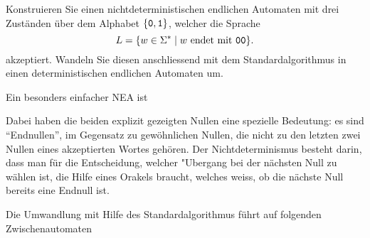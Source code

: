 Konstruieren Sie einen nichtdeterministischen endlichen Automaten
mit drei Zuständen
über dem Alphabet $\{{\tt 0},{\tt 1}\}$, welcher die Sprache
\[
L=\{w\in\Sigma^*\;|\; \text{$w$ endet mit {\tt 00}}\}.
\]
akzeptiert.
Wandeln Sie diesen anschliessend mit dem Standardalgorithmus
in einen deterministischen endlichen Automaten um.


\begin{loesung}
\def\zustand#1#2{
	\draw #1 circle[radius=0.4];
	\node at #1 {#2};
}
\def\akzeptierzustand#1#2{
	\draw #1 circle[radius=0.34];
	\zustand{#1}{#2}
}
\def\pfeil#1#2{
	\draw[->,shorten >= 0.4cm,shorten <= 0.4cm] #1 -- #2;
}
Ein besonders einfacher NEA ist
\begin{center}
\end{center}
Dabei haben die beiden explizit gezeigten Nullen eine spezielle
Bedeutung: es sind ``Endnullen'', im Gegensatz zu gewöhnlichen
Nullen, die nicht zu den letzten zwei Nullen eines akzeptierten Wortes
gehören.
Der Nichtdeterminismus besteht darin, dass man für die
Entscheidung, welcher "Ubergang bei der nächsten Null zu wählen
ist, die Hilfe eines Orakels braucht, welches weiss, ob die
nächste Null bereits eine Endnull ist.

Die Umwandlung mit Hilfe des Standardalgorithmus führt auf folgenden
Zwischenautomaten
\begin{center}
\end{center}
\end{loesung}

